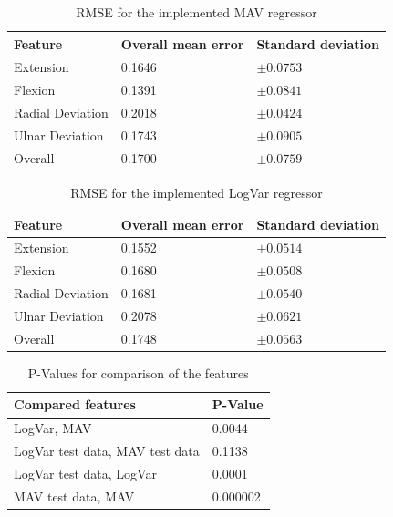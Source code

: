 \documentclass[a4paper, 10pt, conference]{ieeeconf}      %
\begin{document}
\begin{multicol}{2}
	\begin{table}[H]
		\begin{center}
			\begin{tabular}{l l l}
				\hline
				\textbf{Feature} & \textbf{Overall mean error} & \textbf{Standard deviation}\\
				\hline
				Extension & 0.1646 & $\pm 0.0753$ \\
				Flexion & 0.1391 & $\pm 0.0841$ \\
				Radial Deviation & 0.2018 & $\pm 0.0424$ \\
				Ulnar Deviation & 0.1743 & $\pm 0.0905$ \\
				Overall & 0.1700 & $\pm 0.0759$ \\
				\hline
			\end{tabular}
			\caption{RMSE for the implemented MAV regressor}
		\end{center}
	\end{table}
	
	
	\begin{table}[H]
		\begin{center}
			\begin{tabular}{l l l}
				\hline
				\textbf{Feature} & \textbf{Overall mean error} & \textbf{Standard deviation}\\
				\hline
				Extension & 0.1552 & $\pm 0.0514$ \\
				Flexion & 0.1680 & $\pm 0.0508$ \\
				Radial Deviation & 0.1681 & $\pm 0.0540$ \\
				Ulnar Deviation & 0.2078 & $\pm 0.0621$ \\
				Overall & 0.1748 & $\pm 0.0563$ \\
				\hline
			\end{tabular}
			\caption{RMSE for the implemented LogVar regressor}
		\end{center}
	\end{table}
	
	\begin{table}[H]
		\begin{center}
			\begin{tabular}{l l}
				\hline
				\textbf{Compared features} & \textbf{P-Value}\\
				\hline
				LogVar, MAV & 0.0044 \\
				LogVar test data, MAV test data & 0.1138 \\
				LogVar test data, LogVar & 0.0001 \\
				MAV test data, MAV & 0.000002 \\
				\hline
			\end{tabular}
			\caption{P-Values for comparison of the features}
		\end{center}
	\end{table}
	

\end{multicol}
\end{document}
